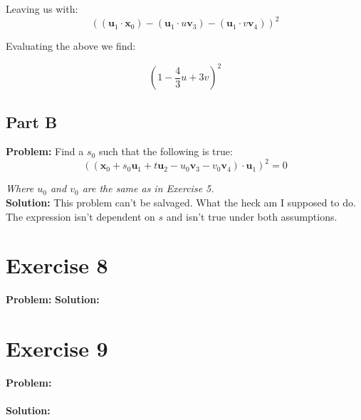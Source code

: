\documentclass{article}
\begin{document}
Leaving us with:
$$((\mathbf u_1\cdot\mathbf x_0)-(\mathbf u_1\cdot u\mathbf v_3)-(\mathbf u_1\cdot v\mathbf v_4))^2$$

Evaluating the above we find:

$$\left(1-\frac{4}{3}u+3v\right)^2$$

\subsection*{Part B}
\textbf{Problem:} Find a $s_0$ such that the following is true:
$$((\mathbf x_0+s_0\mathbf u_1+t\mathbf u_2-u_0\mathbf v_3-v_0\mathbf v_4)\cdot\mathbf u_1)^2=0$$

\textit{Where $u_0$ and $v_0$ are the same as in Exercise 5.}
\\
\textbf{Solution:} This problem can't be salvaged. What the heck am I supposed to do. The expression isn't dependent on $s$ and isn't true under both assumptions.

%

\section*{Exercise 8}
\textbf{Problem:}
\textbf{Solution:}

\section*{Exercise 9}
\textbf{Problem:}
\\\\
\textbf{Solution:}
\end{document}
